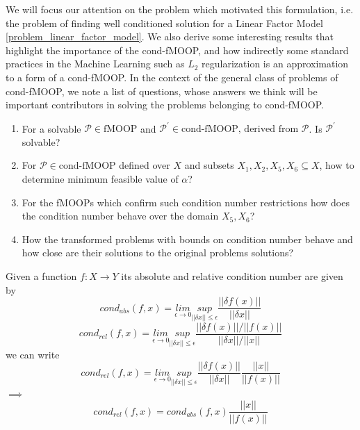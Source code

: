 We will focus our attention on the problem which motivated this formulation, i.e. the problem of finding well conditioned solution for a Linear Factor Model \ref{problem_linear_factor_model}.
\newline \newline  We also derive some interesting results that highlight the importance of the cond-fMOOP, and how indirectly some standard practices in the Machine Learning such as $L_2$ regularization is an approximation to a form of a cond-fMOOP.
\newline \newline In the context of the general class of problems of cond-fMOOP, we note a list of questions, whose answers we think will be important contributors in solving the problems belonging to cond-fMOOP.
\label{important_questions}
\begin{enumerate}
\setlength\itemsep{-1pt}
    \item For a solvable $\mathcal{P} \in \text{fMOOP}$ and $\mathcal{P}^{'} \in \text{cond-fMOOP, derived from } \mathcal{P}$. Is $\mathcal{P}^{'}$ solvable?
    \item For $\mathcal{P} \in \text{cond-fMOOP}$ defined over $X$ and subsets $X_1,X_2,X_5,X_6 \subseteq X$, how to determine minimum feasible value of $\alpha$?
    \item For the fMOOPs which confirm such condition number restrictions how does the condition number behave over the domain $X_5,X_6$? \label{question_behaviour_of_cond_over_x5x6}
    \item How the transformed problems with bounds on condition number behave and how close are their solutions to the original problems solutions? \label{question_transformed_problems_behaviour}
\end{enumerate}

\newpage 
{}
Given a function $f:X\to Y$ its absolute and relative condition number are given by
\begin{equation}
    cond_{abs}(f,x) = \underset{\epsilon \to 0}{lim}\underset{||\delta x||\le \epsilon}{sup} \frac{||\delta f(x)||}{||\delta x||}
\end{equation}
\begin{equation}
    cond_{rel}(f,x) = \underset{\epsilon \to 0}{lim}\underset{||\delta x||\le \epsilon}{sup} \frac{||\delta f(x)||/||f(x)||}{||\delta x||/||x||}
\end{equation}
we can write
\begin{equation}
    cond_{rel}(f,x) = \underset{\epsilon \to 0}{lim}\underset{||\delta x||\le \epsilon}{sup} \frac{||\delta f(x)||}{||\delta x||}\frac{||x||}{||f(x)||}
\end{equation}
$\implies$
\begin{equation} \label{cond_abs_rel_relation}
    cond_{rel}(f,x) = cond_{abs}(f,x)\frac{||x||}{||f(x)||}
\end{equation}

